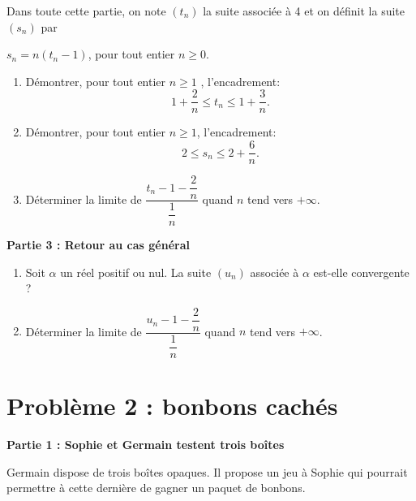 \documentclass[landscape,twocolumn,leqno,a4paper,10pt]{report} %
\renewcommand{\textbf}[1]{\begingroup\bfseries\mathversion{bold}#1\endgroup}		%
\begin{document}
Dans toute cette partie, on note $\left(t_n\right)$ la suite associée à 4 et on définit la suite $\left(s_n\right)$ par 
\begin{center}$s_n =  n\left(t_n - 1\right)$, pour tout entier $n \geqslant 0$.

\begin{enumerate}[resume]
\item Démontrer, pour tout entier $n \geqslant 1$ , l'encadrement:
\[1 + \dfrac 2n \leqslant t_n \leqslant 1 + \dfrac 3n.\]

\item Démontrer, pour tout entier $n \geqslant 1$, l'encadrement:
\[2 \leqslant s_n \leqslant 2 + \dfrac 6n.\]

\item Déterminer la limite de $\dfrac{t_n - 1 - \dfrac 2n}{\dfrac 1n}$
 quand $n$ tend vers $+\infty$.
\end{enumerate}

\bigskip

\begin{center}\textbf{Partie 3 : Retour au cas général}\end{center}

\begin{enumerate}[resume]
\item Soit $\alpha$  un réel positif ou nul. La suite $\left(u_n\right)$ associée à $\alpha$ est-elle convergente ?

\item Déterminer la limite de $\dfrac{u_n - 1 - \dfrac 2n}{\dfrac 1n}$
quand $n$ tend vers $+\infty$.
\end{enumerate}

\medskip

\section{Problème 2 : bonbons cachés}

\bigskip

\textbf{Partie 1 : Sophie et Germain testent trois boîtes}
\end{center}

\smallskip

Germain dispose de trois boîtes opaques. Il propose un jeu à Sophie qui pourrait permettre à cette dernière de gagner un paquet de bonbons.

\medskip
\end{document}

